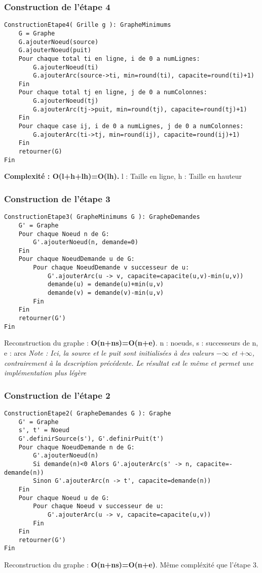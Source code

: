 \documentclass[letterpaper,12pt]{article}
\begin{document}
\subsubsection{Construction de l'étape 4}
\begin{lstlisting}
ConstructionEtape4( Grille g ): GrapheMinimums
    G = Graphe
    G.ajouterNoeud(source)
    G.ajouterNoeud(puit)
    Pour chaque total ti en ligne, i de 0 a numLignes:
        G.ajouterNoeud(ti)
        G.ajouterArc(source->ti, min=round(ti), capacite=round(ti)+1)
    Fin
    Pour chaque total tj en ligne, j de 0 a numColonnes:
        G.ajouterNoeud(tj)
        G.ajouterArc(tj->puit, min=round(tj), capacite=round(tj)+1)
    Fin
    Pour chaque case ij, i de 0 a numLignes, j de 0 a numColonnes:
        G.ajouterArc(ti->tj, min=round(ij), capacite=round(ij)+1)
    Fin
    retourner(G)
Fin
\end{lstlisting}
\textbf{Complexité : O(l+h+lh)=O(lh).} l : Taille en ligne, h : Taille en hauteur
\hfill \break

\subsubsection{Construction de l'étape 3}
\begin{lstlisting}
ConstructionEtape3( GrapheMinimums G ): GrapheDemandes
    G' = Graphe
    Pour chaque Noeud n de G:
        G'.ajouterNoeud(n, demande=0)
    Fin
    Pour chaque NoeudDemande u de G:
        Pour chaque NoeudDemande v successeur de u:
            G'.ajouterArc(u -> v, capacite=capacite(u,v)-min(u,v))
            demande(u) = demande(u)+min(u,v)
            demande(v) = demande(v)-min(u,v)
        Fin
    Fin
    retourner(G')
Fin
\end{lstlisting}
Reconstruction du graphe : \textbf{O(n+ns)=O(n+e)}. n : noeuds, s : successeurs de n, e : arcs
\textit{Note : Ici, la source et le puit sont initialisées à des valeurs $-\infty$ et $+\infty$, contrairement à la description précédente. Le résultat est le même et permet une implémentation plus légère}
\hfill \break

\subsubsection{Construction de l'étape 2}
\begin{lstlisting}
ConstructionEtape2( GrapheDemandes G ): Graphe
    G' = Graphe
    s', t' = Noeud
    G'.definirSource(s'), G'.definirPuit(t')
    Pour chaque NoeudDemande n de G:
        G'.ajouterNoeud(n)
        Si demande(n)<0 Alors G'.ajouterArc(s' -> n, capacite=-demande(n))
        Sinon G'.ajouterArc(n -> t', capacite=demande(n))
    Fin
    Pour chaque Noeud u de G:
        Pour chaque Noeud v successeur de u:
            G'.ajouterArc(u -> v, capacite=capacite(u,v))
        Fin
    Fin
    retourner(G')
Fin

\end{lstlisting}
Reconstruction du graphe : \textbf{O(n+ns)=O(n+e)}. Même compléxité que l'étape 3.
\hfill \break
\end{document}
